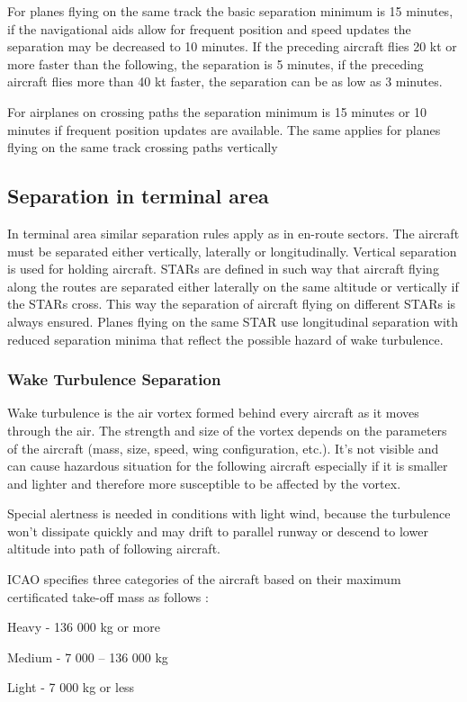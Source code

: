 For planes flying on the same track the basic separation minimum is 15 minutes, if the navigational aids allow for frequent position and speed updates the separation may be decreased to 10 minutes. If the preceding aircraft flies 20 kt or more faster than the following, the separation is 5 minutes, if the preceding aircraft flies more than 40 kt faster, the separation can be as low as 3 minutes. \cite[Chapter 5]{doc4444}

For airplanes on crossing paths the separation minimum is 15 minutes or 10 minutes if frequent position updates are available. The same applies for planes flying on the same track crossing paths vertically

\subsection{Separation in terminal area}

In terminal area similar separation rules apply as in en-route sectors. The aircraft must be separated either vertically, laterally or longitudinally. Vertical separation is used for holding aircraft. STARs are defined in such way that aircraft flying along the routes are separated either laterally on the same altitude or vertically if the STARs cross. This way the separation of aircraft flying on different STARs is always ensured. Planes flying on the same STAR use longitudinal separation with reduced separation minima that reflect the possible hazard of wake turbulence.

\subsubsection{Wake Turbulence Separation}

Wake turbulence is the air vortex formed behind every aircraft as it moves through the air. The strength and size of the vortex depends on the parameters of the aircraft (mass, size, speed, wing configuration, etc.). It's not visible and can cause hazardous situation for the following aircraft especially if it is smaller and lighter and therefore more susceptible to be affected by the vortex.

Special alertness is needed in conditions with light wind, because the turbulence won't dissipate quickly and may drift to parallel runway or descend to lower altitude into path of following aircraft.

ICAO specifies three categories of the aircraft based on their maximum certificated take-off mass as follows \cite[Chapter 4]{doc4444}:
\bitem
\item Heavy - 136 000 kg or more
\item Medium - 7 000 – 136 000 kg
\item Light - 7 000 kg or less
\eitem

